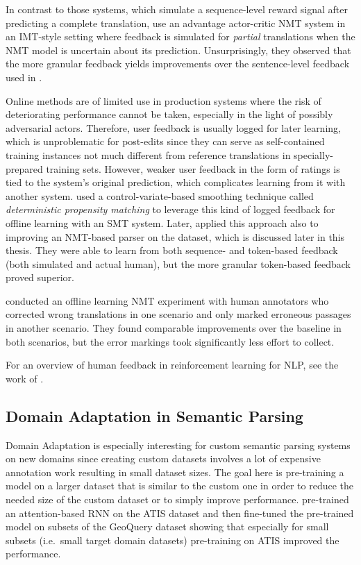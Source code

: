 In contrast to those systems, which simulate a sequence-level reward signal
after predicting a complete translation, \textcite{lam-2018} use an advantage
actor-critic NMT system in an IMT-style setting where feedback is simulated for
\emph{partial} translations when the NMT model is uncertain about its
prediction. Unsurprisingly, they observed that the more granular feedback yields
improvements over the sentence-level feedback used in \textcite{nguyen-2017}.

Online methods are of limited use in production systems where the risk of
deteriorating performance cannot be taken, especially in the light of possibly
adversarial actors. Therefore, user feedback is usually logged for later
learning, which is unproblematic for post-edits since they can serve as
self-contained training instances not much different from reference translations
in specially-prepared training sets. However, weaker user feedback in the form
of ratings is tied to the system’s original prediction, which complicates
learning from it with another system. \textcite{lawrence-2017} used a
control-variate-based smoothing technique called \emph{deterministic propensity
  matching} to leverage this kind of logged feedback for offline learning with
an SMT system. Later, \textcite{lawrence-2018} applied this approach also to
improving an NMT-based parser on the \nlmapstwo{} dataset, which is discussed
later in this thesis. They were able to learn from both sequence- and
token-based feedback (both simulated and actual human), but the more granular
token-based feedback proved superior.

\textcite{kreutzer-2020a} conducted an offline learning NMT experiment with
human annotators who corrected wrong translations in one scenario and only
marked erroneous passages in another scenario. They found comparable
improvements over the baseline in both scenarios, but the error markings took
significantly less effort to collect.

For an overview of human feedback in reinforcement learning for NLP, see the
work of \textcite{kreutzer-2020b}.

\subsection{Domain Adaptation in Semantic Parsing}

Domain Adaptation is especially interesting for custom semantic parsing systems
on new domains since creating custom datasets involves a lot of expensive
annotation work resulting in small dataset sizes. The goal here is pre-training
a model on a larger dataset that is similar to the custom one in order to reduce
the needed size of the custom dataset or to simply improve performance.
\textcite{kennardi-2019} pre-trained an attention-based RNN on the ATIS dataset
and then fine-tuned the pre-trained model on subsets of the GeoQuery dataset
showing that especially for small subsets (i.e.\ small target domain datasets)
pre-training on ATIS improved the performance.

